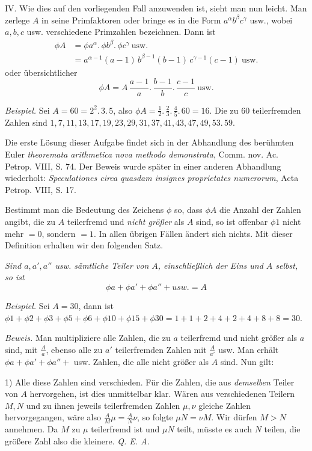 IV. Wie dies auf den vorliegenden Fall anzuwenden ist, sieht man nun leicht. Man zerlege $A$ in seine Primfaktoren oder bringe es in die Form $a^\alpha b^\beta c^\gamma$ usw., wobei $a,b,c$ usw. verschiedene Primzahlen bezeichnen. Dann ist
\[
\begin{aligned}
\phi A&=\phi a^\alpha.\,\phi b^\beta.\,\phi c^\gamma\ \mathrm{usw.}\\
&=a^{\alpha-1}(a-1)\,b^{\beta-1}(b-1)\,c^{\gamma-1}(c-1)\ \mathrm{usw.}
\end{aligned}
\]
oder übersichtlicher
\[\phi A=A\,\frac{a-1}{a}.\,\frac{b-1}{b}.\,\frac{c-1}{c}\ \mathrm{usw.}\]

\emph{Beispiel.} Sei $A=60=2^2.\,3.\,5$, also $\phi A=\frac{1}{2}.\,\frac{2}{3}.\,\frac{4}{5}.\,60=16$. Die zu $60$ teilerfremden Zahlen sind $1,7,11,13,17,19,23,29,31,37,41,43,47,49,53.\,59.$

Die erste Lösung dieser Aufgabe findet sich in der Abhandlung des berühmten Euler \emph{theoremata arithmetica nova methodo demonstrata}, Comm. nov. Ac. Petrop. VIII, S. 74. Der Beweis wurde später in einer anderen Abhandlung wiederholt: \emph{Speculationes circa quasdam insignes proprietates numerorum}, Acta Petrop. VIII, S. 17.

Bestimmt man die Bedeutung des Zeichens $\phi$ so, dass $\phi A$ die Anzahl der Zahlen angibt, die zu $A$ teilerfremd und \emph{nicht größer} als $A$ sind, so ist offenbar $\phi1$ nicht mehr $=0$, sondern $=1$. In allen übrigen Fällen ändert sich nichts. Mit dieser Definition erhalten wir den folgenden Satz.

\emph{Sind $a,a',a''$ usw. sämtliche Teiler von $A$, einschließlich der Eins und $A$ selbst, so ist}
\[\phi a+\phi a'+\phi a''+\textit{usw.}=A\]

\emph{Beispiel.} Sei $A=30$, dann ist $\phi1+\phi2+\phi3+\phi5+\phi6+\phi10+\phi15+\phi30=1+1+2+4+2+4+8+8=30$.

\emph{Beweis.} Man multipliziere alle Zahlen, die zu $a$ teilerfremd und nicht größer als $a$ sind, mit $\frac{A}{a}$, ebenso alle zu $a'$ teilerfremden Zahlen mit $\frac{A}{a'}$ usw. Man erhält $\phi a+\phi a'
+\phi a''+$ usw. Zahlen, die alle nicht größer als $A$ sind. Nun gilt:

1) Alle diese Zahlen sind verschieden. Für die Zahlen, die aus \emph{demselben} Teiler von $A$ hervorgehen, ist dies unmittelbar klar. Wären aus verschiedenen Teilern $M,N$ und zu ihnen jeweils teilerfremden Zahlen $\mu,\nu$ gleiche Zahlen hervorgegangen, wäre also $\frac{A}{M}\mu=\frac{A}{N}\nu$, so folgte $\mu N=\nu M$. Wir dürfen $M>N$ annehmen. Da $M$ zu $\mu$ teilerfremd ist und $\mu N$ teilt, müsste es auch $N$ teilen, die größere Zahl also die kleinere. \emph{Q. E. A.}

